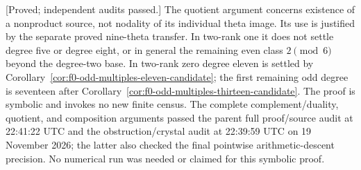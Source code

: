 \begin{remark}
\label{rem:nonordinary-arbitrary-odd-neighbor-scope-candidate}
\textup{[Proved; independent audits passed.]}
The quotient argument concerns existence of a nonproduct source,
not nodality of its individual theta image. Its use is justified
by the separate proved nine-theta transfer. In two-rank one it
does not settle degree five or degree eight, or in general the
remaining even class $2\pmod6$ beyond the degree-two base. In
two-rank zero degree eleven is settled by
Corollary~\ref{cor:f0-odd-multiples-eleven-candidate}; the first
remaining odd degree is seventeen after
Corollary~\ref{cor:f0-odd-multiples-thirteen-candidate}.
The proof is symbolic and invokes no new finite census. The complete complement/duality, quotient, and composition
arguments passed the parent full proof/source audit at
22:41:22 UTC and the obstruction/crystal audit at 22:39:59 UTC
on 19 November 2026; the latter also checked the final
pointwise arithmetic-descent precision. No numerical run
was needed or claimed for this symbolic proof.
\end{remark}
